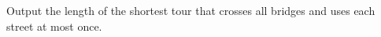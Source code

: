 
	Output the length of the shortest tour that crosses all bridges and uses each street at most once.
